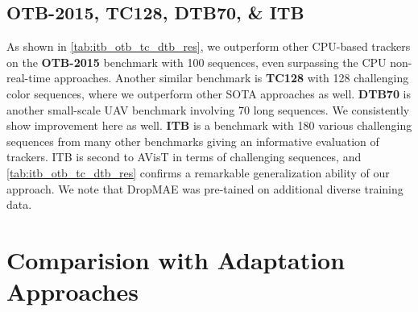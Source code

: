   \subsection{OTB-2015, TC128, DTB70, \& ITB}
  As shown in \ref{tab:itb_otb_tc_dtb_res}, we outperform other CPU-based trackers on the \textbf{OTB-2015}\cite{7001050} benchmark with 100 sequences, even surpassing the CPU non-real-time approaches. 
  Another similar benchmark is \textbf{TC128}\cite{liang2015encoding} with 128 challenging color sequences, where we outperform other SOTA approaches as well. \textbf{DTB70}\cite{drone-tracking} is another small-scale UAV benchmark involving 70 long sequences. We consistently show improvement here as well. \textbf{ITB}\cite{li2021informative} is a benchmark with 180 various challenging sequences from many other benchmarks giving an informative evaluation of trackers. ITB is second to AVisT in terms of challenging sequences, and \ref{tab:itb_otb_tc_dtb_res} confirms a remarkable generalization ability of our approach. We note that DropMAE \cite{wu2023dropmae} was pre-tained on additional diverse training data.
  
  
  
	
  \section{Comparision with Adaptation Approaches}\label{sec:tta_res}
  
